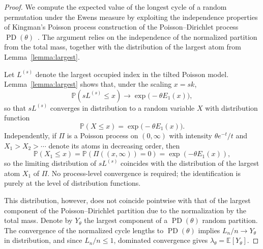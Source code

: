 \documentclass{amsart}
\theoremstyle{definition}
\theoremstyle{remark}
\numberwithin{equation}{section}
\newcommand{\PP}{\mathbb{P}}
\newcommand{\EE}{\mathbb{E}}
\DeclareMathOperator{\PD}{PD}
\begin{document}
\begin{proof}
We compute the expected value of the longest cycle of a random permutation under the Ewens measure by exploiting the independence properties of Kingman's Poisson process construction of the Poisson--Dirichlet process $\PD(\theta)$~\cite{Kingman1975,Kingman1993}. The argument relies on the independence of the normalized partition from the total mass, together with the distribution of the largest atom from Lemma~\ref{lemma:largest}.

Let $L^{(s)}$ denote the largest occupied index in the tilted Poisson model. Lemma~\ref{lemma:largest} shows that, under the scaling $x = s k$,
\begin{equation}
\mathbb{P}(sL^{(s)} \le x) \longrightarrow \exp\bigl(-\theta E_{1}(x)\bigr),
\end{equation}
so that $sL^{(s)}$ converges in distribution to a random variable $X$
with distribution function
\begin{equation}
\mathbb{P}(X \le x) = \exp\bigl(-\theta E_{1}(x)\bigr).
\end{equation}
Independently, if $\Pi$ is a Poisson process on $(0,\infty)$ with
intensity $\theta e^{-t}/t$ and $X_{1} > X_{2} > \cdots$ denote its
atoms in decreasing order, then
\begin{equation}
\PP(X_{1} \le x) = \PP(\Pi((x,\infty))=0) = \exp(-\theta E_{1}(x)),
\end{equation}
so the limiting distribution of $sL^{(s)}$ coincides with the
distribution of the largest atom $X_{1}$ of $\Pi$. No process-level
convergence is required; the identification is purely at the level of
distribution functions.

This distribution, however, does not coincide pointwise with that of the largest component of the Poisson--Dirichlet partition due to the normalization by the total mass. Denote by $Y_{\theta}$ the largest component of a $\PD(\theta)$ random partition. The convergence of the normalized cycle lengths to $\PD(\theta)$ implies $L_{n}/n \to Y_{\theta}$ in distribution, and since $L_{n}/n \le 1$, dominated convergence gives $\lambda_{\theta} = \EE[Y_{\theta}]$.


\end{proof}
\end{document}
